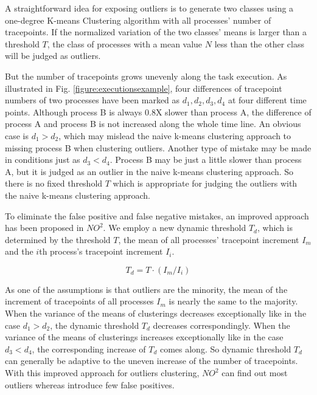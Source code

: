 A straightforward idea for exposing outliers is to generate two classes using a one-degree K-means
Clustering algorithm with all processes' number of tracepoints. If the normalized
variation of the two classes' means is larger than a threshold $T$, the class of
processes with a mean value $N$ less than the other class will be judged as outliers.

But the number of tracepoints grows unevenly along the task execution.
As illustrated in Fig. \ref{figure:executionsexample}, four differences of tracepoint numbers of two processes have been
marked as $d_1, d_2, d_3, d_4$ at four different time points. Although process B is always
0.8X slower than process A, the difference of process A and process B is not increased
along the whole time line. An obvious case is $d_1 > d_2$, which may mislead the naive
k-means clustering approach to missing process B when clustering outliers. Another type of
mistake may be made in conditions just as $d_3 < d_4$. Process B may be just a little slower than
process A, but it is judged as an outlier in the naive k-means clustering approach. So there is no
fixed threshold $T$ which is appropriate for judging the outliers with the naive k-means
clustering approach.

To eliminate the false positive and false negative mistakes, an improved approach
has been proposed in $NO^2$. We employ a new dynamic threshold $T_d$, which is
determined by the threshold $T$, the mean of all processes' tracepoint increment $I_m$
and the $i$th process's tracepoint increment $I_i$.

$$T_d = T \cdot (I_m / I_i)$$

As one of the assumptions is that outliers are the minority, the mean of the increment of
tracepoints of all processes $I_m$ is nearly the same to the majority. When the variance
of the means of clusterings decreases exceptionally like in the case $d_1 > d_2$, the dynamic
threshold $T_d$ decreases correspondingly. When the variance of the means of clusterings
increases exceptionally like in the case $d_3 < d_4$, the corresponding increase of $T_d$
comes along. So dynamic threshold $T_d$ can generally be adaptive to the uneven increase of the number
of tracepoints. With this improved approach for outliers clustering, $NO^2$
can find out most outliers whereas introduce few false positives. 
